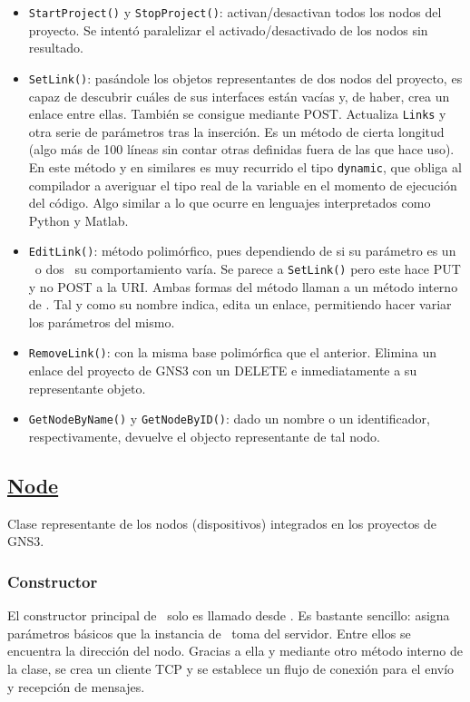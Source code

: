 \begin{itemize}
\item \texttt{StartProject()} y \texttt{StopProject()}: activan/desactivan todos los nodos del proyecto. Se intentó paralelizar el activado/desactivado de los nodos sin resultado.
\item \texttt{SetLink()}: pasándole los objetos representantes de dos nodos del proyecto, es capaz de descubrir cuáles de sus interfaces están vacías y, de haber, crea un enlace entre ellas. También se consigue mediante POST. Actualiza \texttt{Links} y otra serie de parámetros tras la inserción. Es un método de cierta longitud (algo más de 100 líneas sin contar otras definidas fuera de las que hace uso). En este método y en similares es muy recurrido el tipo \texttt{dynamic}, que obliga al compilador a averiguar el tipo real de la variable en el momento de ejecución del código. Algo similar a lo que ocurre en lenguajes interpretados como Python y Matlab.
\item \texttt{EditLink()}: método polimórfico, pues dependiendo de si su parámetro es un \LINK~o dos \NODE~su comportamiento varía. Se parece a \texttt{SetLink()} pero este hace PUT y no POST a la URI. Ambas formas del método llaman a un método interno de \LINK. Tal y como su nombre indica, edita un enlace, permitiendo hacer variar los parámetros del mismo.
\item \texttt{RemoveLink()}: con la misma base polimórfica que el anterior. Elimina un enlace del proyecto de GNS3 con un DELETE e inmediatamente a su representante objeto.
\item \texttt{GetNodeByName()} y \texttt{GetNodeByID()}: dado un nombre o un identificador, respectivamente, devuelve el objecto representante de tal nodo.
\end{itemize}

\subsection[Node]{\href{https://github.com/aorestr/GNS3sharp/blob/master/node.cs}{Node}}
Clase representante de los nodos (dispositivos) integrados en los proyectos de GNS3.

\subsubsection{Constructor}
El constructor principal de \NODE~solo es llamado desde \GNSCS. Es bastante sencillo: asigna parámetros básicos que la instancia de \GNSCS~toma del servidor. Entre ellos se encuentra la dirección del nodo. Gracias a ella y mediante otro método interno de la clase, se crea un cliente TCP y se establece un flujo de conexión para el envío y recepción de mensajes.

